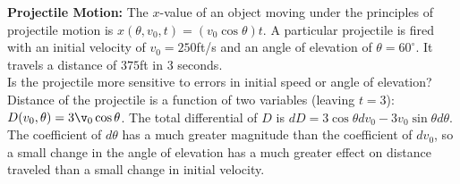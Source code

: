 {\textbf{Projectile Motion:} The $x$-value of an object moving under the principles of projectile motion is $x(\theta,v_0,t)= (v_0\cos\theta)t$. A particular projectile is fired with an initial velocity of $v_0=250$ft/s and an angle of elevation of $\theta = 60^\circ$. It travels a distance of $375$ft in 3 seconds.\\

Is the projectile more sensitive to errors in initial speed or angle of elevation?
}
{Distance of the projectile is a function of two variables (leaving $t=3$): $D(v_0,\theta) = 3\v_0\cos\theta$. The total differential of $D$ is $dD = 3\cos\theta dv_0-3v_0\sin\theta d\theta$. The coefficient of $d\theta$ has a much greater magnitude than the coefficient of $dv_0$, so a small change in the angle of elevation has a much greater effect on distance traveled than a small change in initial velocity.
}